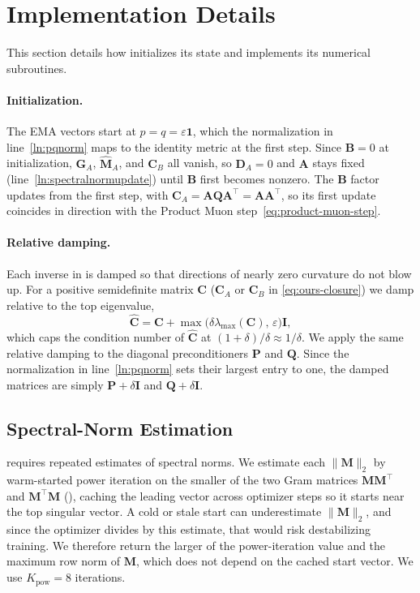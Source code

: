\documentclass[11pt]{article}
\newcommand{\mat}[1]{\bm{#1}}
\newcommand{\norm}[1]{\| #1\|}
\begin{document}
\clearpage
\section{Implementation Details}
\label{app:primitives}
This section details how  initializes its state and implements
its numerical subroutines.

\paragraph{Initialization.}\label{app:init}
The EMA vectors start at $p = q = \varepsilon\mathbf{1}$, which the
normalization in line~\ref{ln:pqnorm} maps to the identity metric at the first
step. Since $\mat{B}=0$ at initialization, $\mat{G}_A$, $\widehat{\mat{M}}_A$, and $\mat{C}_B$ all
vanish, so $\mat{D}_A=0$ and $\mat{A}$ stays fixed (line~\ref{ln:spectralnormupdate}) until
$\mat{B}$ first becomes nonzero. The $\mat{B}$ factor updates from the first step, with
$\mat{C}_A = \mat{A}\mat{Q}\mat{A}^\top = \mat{A}\mat{A}^\top$, so its first update coincides in direction with the
Product Muon step~\eqref{eq:product-muon-step}.

\paragraph{Relative damping.}\label{app:damping}
Each inverse in  is damped so that directions of
nearly zero curvature do not blow up. For a positive
semidefinite matrix $\mat{C}$ ($\mat{C}_A$ or $\mat{C}_B$ in \eqref{eq:ours-closure}) we damp relative to the top eigenvalue,
\[
    \widehat{\mat{C}} = \mat{C} + \max\bigl(\delta\lambda_{\max}(\mat{C}),\, \varepsilon\bigr) \mat{I},
\]
which caps the condition number of $\widehat{\mat{C}}$ at $(1+\delta)/\delta \approx 1/\delta$.
We apply the same relative damping to the diagonal preconditioners $\mat{P}$ and $\mat{Q}$.
Since the normalization in line~\ref{ln:pqnorm} sets their largest entry to
one, the damped matrices are simply $\mat{P}+\delta \mat{I}$ and $\mat{Q}+\delta \mat{I}$.

\subsection{Spectral-Norm Estimation}
\label{app:smax}
 requires repeated estimates of spectral norms.  
We estimate each $\norm{\mat{M}}_2$ by warm-started power iteration on the smaller of the two Gram matrices $\mat{M}\mat{M}^\top$ and $\mat{M}^\top \mat{M}$ (), caching the leading vector across optimizer steps so it starts near the top singular vector. A cold or stale start
can underestimate $\norm{\mat{M}}_2$, and since the optimizer divides by this estimate, that would risk destabilizing training.  We therefore return the larger of the power-iteration value and the maximum row norm of $\mat{M}$, which does not depend on the cached start vector. We use $K_{\mathrm{pow}} = 8$ iterations.
\end{document}
